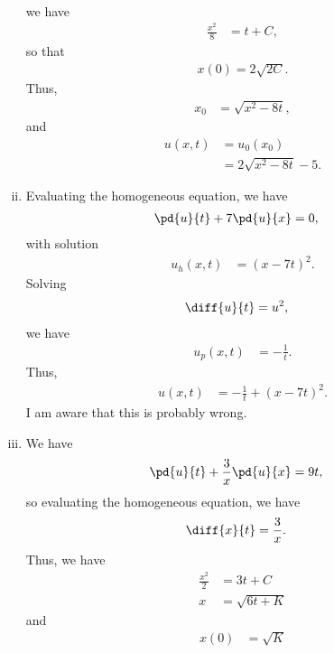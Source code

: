 \documentclass[10pt]{mypackage}
\begin{document}
\begin{solution}
\begin{enumerate}[(i)]
\begin{align*}
      \end{align*}
      we have
      \begin{align*}
        \frac{x^2}{8} &= t + C,
      \end{align*}
      so that
      \begin{align*}
        x(0) = 2\sqrt{2C}.
      \end{align*}
      Thus,
      \begin{align*}
        x_0 &= \sqrt{x^2-8t},
      \end{align*}
      and
      \begin{align*}
        u\left( x,t \right) &= u_0\left( x_0 \right)\\
                            &= 2\sqrt{x^2-8t} - 5.
      \end{align*}
    \item Evaluating the homogeneous equation, we have
      \begin{align*}
        \pd{u}{t} + 7 \pd{u}{x} &= 0,
      \end{align*}
      with solution
      \begin{align*}
        u_h\left( x,t \right) &= \left( x-7t \right)^2.
      \end{align*}
      Solving
      \begin{align*}
        \diff{u}{t} &= u^2,
      \end{align*}
      we have
      \begin{align*}
        u_p(x,t) &= -\frac{1}{t}.
      \end{align*}
      Thus,
      \begin{align*}
        u\left( x,t \right) &= -\frac{1}{t} + \left( x-7t \right)^2.
      \end{align*}
      I am aware that this is probably wrong.
    \item We have
      \begin{align*}
        \pd{u}{t} + \frac{3}{x}\pd{u}{x} &= 9t,
      \end{align*}
      so evaluating the homogeneous equation, we have
      \begin{align*}
        \diff{x}{t} &= \frac{3}{x}.
      \end{align*}
      Thus, we have
      \begin{align*}
        \frac{x^2}{2} &= 3t + C\\
        x &= \sqrt{6t + K}
      \end{align*}
      and
      \begin{align*}
        x(0) &= \sqrt{K}\\

\end{align*}
\end{enumerate}
\end{solution}
\end{document}

